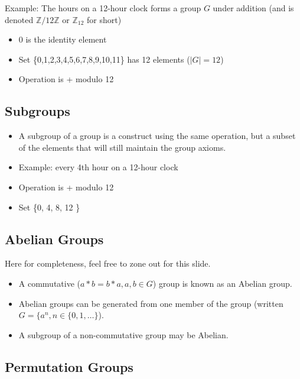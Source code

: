 \documentclass[xcolor=pdftex,dvipsnames,table]{beamer}
\begin{document}
\begin{frame}
  Example: The hours on a 12-hour clock forms a group $G$ under addition (and is denoted $ \mathbb{Z} / 12\mathbb{Z}$ or $\mathbb{Z}_{12}$ for short)
  \begin{itemize}
    \item 0 is the identity element
    \item Set \{0,1,2,3,4,5,6,7,8,9,10,11\} has 12 elements ($|G| = 12$)
    \item Operation is + modulo 12
  \end{itemize}
  
\end{frame}

\subsection{Subgroups}
\begin{frame}
  \begin{itemize}
    \item A subgroup of a group is a construct using the same operation, but a subset of the elements that will still maintain the group axioms.
    \item Example: every 4th hour on a 12-hour clock
    \item Operation is + modulo 12
    \item Set \{0, 4, 8, 12 \}
  \end{itemize}
\end{frame}

\subsection{Abelian Groups}
\begin{frame}
  Here for completeness, feel free to zone out for this slide.
  \begin{itemize}
    \item A commutative ($a * b = b * a, a, b \in G$) group is known as an Abelian group.
    \item Abelian groups can be generated from one member of the group (written $G = \{ a^n, n \in \{0, 1, \hdots \}$).
    \item A subgroup of a non-commutative group may be Abelian.
  \end{itemize}
\end{frame}

\subsection{Permutation Groups}
\end{document}

